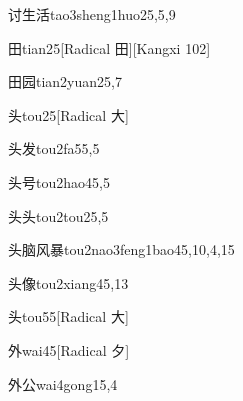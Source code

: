 \begin{verbete}{讨生活}{tao3sheng1huo2}{5,5,9}
\end{verbete}

\begin{verbete}{田}{tian2}{5}[Radical 田][Kangxi 102]
\end{verbete}

\begin{verbete}{田园}{tian2yuan2}{5,7}
\end{verbete}

\begin{verbete}{头}{tou2}{5}[Radical 大]
\end{verbete}

\begin{verbete}{头发}{tou2fa5}{5,5}
\end{verbete}

\begin{verbete}{头号}{tou2hao4}{5,5}
\end{verbete}

\begin{verbete}{头头}{tou2tou2}{5,5}
\end{verbete}

\begin{verbete}{头脑风暴}{tou2nao3feng1bao4}{5,10,4,15}
\end{verbete}

\begin{verbete}{头像}{tou2xiang4}{5,13}
\end{verbete}

\begin{verbete}{头}{tou5}{5}[Radical 大]
\end{verbete}

\begin{verbete}{外}{wai4}{5}[Radical 夕]
\end{verbete}

\begin{verbete}{外公}{wai4gong1}{5,4}
\end{verbete}

